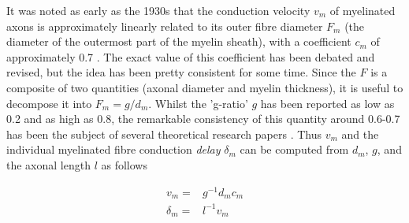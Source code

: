 It was noted as early as the 1930s that the conduction velocity $v_m$ of myelinated axons is approximately linearly related to its outer fibre diameter $F_m$ (the diameter of the outermost part of the myelin sheath), with a coefficient $c_m$ of approximately 0.7  \citep{hursh1939the,rushton1951a,waxman1972relative}. The exact value of this coefficient has been debated and revised, but the idea has been pretty consistent for some time. Since the $F$ is a composite of two quantities (axonal diameter and myelin thickness), it is useful to decompose it into $F_m = g/d_m$. Whilst the 'g-ratio' $g$ has been reported as low as 0.2 and as high as 0.8, the remarkable consistency of this quantity around 0.6-0.7 has been the subject of several theoretical research papers 
\cite{rushton1951a,chomiak2009what,paus2009could,caminiti2009evolution,ritchie1982on}. Thus $v_m$ and the individual myelinated fibre conduction \textit{delay} $\delta_m$ can be computed from $d_m$, $g$, and the axonal length $l$ as follows

\begin{eqnarray}
v_m      =& g^{-1} d_m c_m \\
\delta_m =& l^{-1} v_m
\end{eqnarray}

